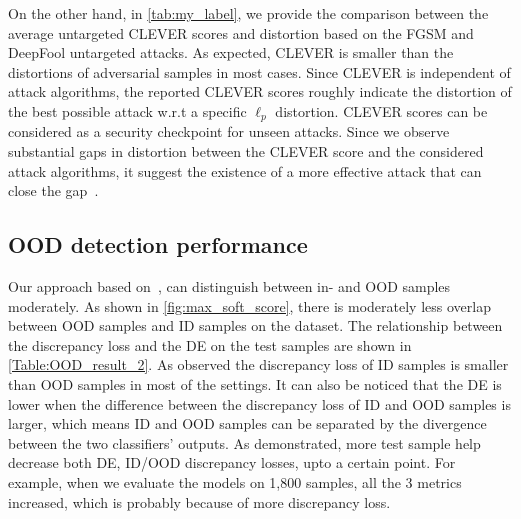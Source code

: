 \hspace*{3.5mm} On the other hand, in \cref{tab:my_label}, we provide the comparison between the average untargeted CLEVER scores and distortion based on the FGSM and DeepFool untargeted attacks. As expected, CLEVER is smaller than the distortions of adversarial samples in most cases. Since CLEVER is independent of attack algorithms, the reported CLEVER scores roughly indicate the distortion of the best possible attack w.r.t a specific $\ell_{p}$ distortion. CLEVER scores can be considered as a security checkpoint for unseen attacks. Since we observe substantial gaps in distortion between the CLEVER score and the considered attack algorithms, it suggest the existence of a more effective attack that can close the gap~\cite{weng2018evaluating}.

\subsection{OOD detection performance}
Our approach based on~\cite{OOD19}, can distinguish between in- and OOD samples moderately. As shown in \cref{fig:max_soft_score}, there is moderately less overlap between OOD samples and ID samples on the dataset. The relationship between the discrepancy loss and the DE on the test samples are shown in \cref{Table:OOD_result_2}. As observed the discrepancy loss of ID samples is smaller than OOD samples in most of the settings. It can also be noticed that the DE is lower when the difference between the discrepancy loss of ID and OOD samples is larger, which means ID and OOD samples can be separated by the divergence between the two classifiers’ outputs. As demonstrated, more test sample help decrease both DE, ID/OOD discrepancy losses, upto a certain point. For example, when we evaluate the models on 1,800 samples, all the 3 metrics increased, which is probably because of more discrepancy loss. 

